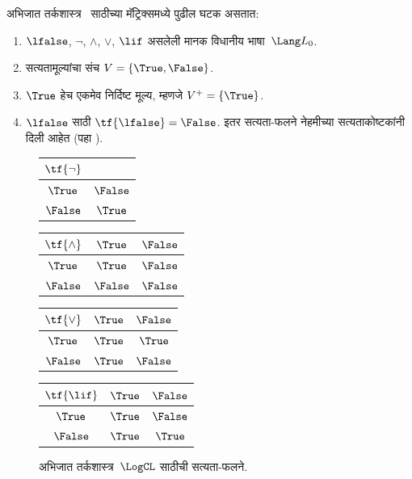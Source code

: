 \documentclass[../../../include/open-logic-section]{subfiles}
\begin{document}
\begin{ex}
अभिजात तर्कशास्त्र~\LogCL{} साठीच्या मॅट्रिक्समध्ये पुढील घटक असतात:
\begin{enumerate}
  \item $\lfalse$, $\lnot$, $\land$, $\lor$, $\lif$ असलेली
  मानक विधानीय भाषा~$\Lang L_0$.
  \item सत्यतामूल्यांचा संच $V = \{\True, \False\}$.
  \item $\True$ हेच एकमेव निर्दिष्ट मूल्य, म्हणजे $V^+ = \{\True\}$.
  \item $\lfalse$ साठी $\tf{\lfalse} = \False$. इतर सत्यता-फलने
  नेहमीच्या सत्यताकोष्टकांनी दिली आहेत (पहा
  ).
\end{enumerate}
\begin{figure}
  \begin{center}
      \begin{tabular}{c|c}
        $\tf{\lnot}$ & \\
        \hline
        $\True$ & $\False$ \\
        $\False$ & $\True$
      \end{tabular}
      \quad
      \begin{tabular}{c|cc}
        $\tf{\land}$ & $\True$ & $\False$ \\
        \hline
        $\True$ & $\True$ & $\False$ \\
        $\False$ & $\False$ & $\False$
      \end{tabular}
      \quad
      \begin{tabular}{c|cc}
        $\tf{\lor}$ & $\True$ & $\False$ \\
        \hline
        $\True$ & $\True$ & $\True$ \\
        $\False$ & $\True$ & $\False$
      \end{tabular}
      \quad
      \begin{tabular}{c|cc}
        $\tf{\lif}$ & $\True$ & $\False$ \\
        \hline
        $\True$ & $\True$ & $\False$ \\
        $\False$ & $\True$ & $\True$
      \end{tabular}
    \end{center}
    \caption{अभिजात तर्कशास्त्र~$\LogCL$ साठीची सत्यता-फलने.}
  \end{figure}
\end{ex}
\end{document}
